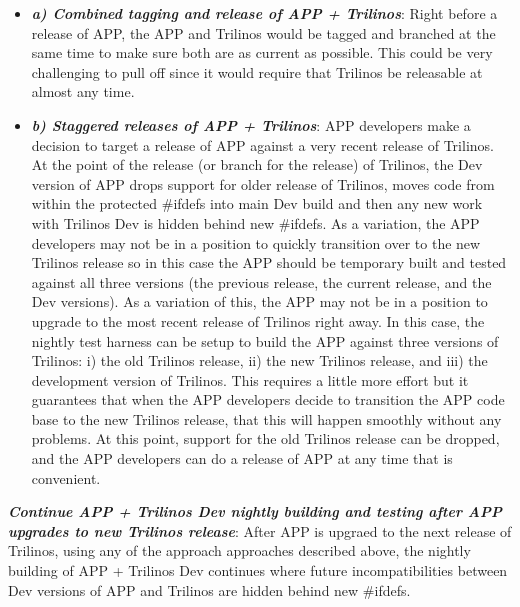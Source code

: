 \documentclass[pdf,ps2pdf,11pt]{SANDreport}
\begin{document}
    \begin{itemize}

    {}\item\textit{\textbf{a) Combined tagging and release of APP +
    Trilinos}}: Right before a release of APP, the APP and Trilinos would be
    tagged and branched at the same time to make sure both are as current as
    possible.  This could be very challenging to pull off since it would
    require that Trilinos be releasable at almost any time.

    {}\item\textit{\textbf{b) Staggered releases of APP + Trilinos}}: APP
    developers make a decision to target a release of APP against a very
    recent release of Trilinos.  At the point of the release (or branch for
    the release) of Trilinos, the Dev version of APP drops support for older
    release of Trilinos, moves code from within the protected {}\#ifdefs into
    main Dev build and then any new work with Trilinos Dev is hidden behind
    new {}\#ifdefs.  As a variation, the APP developers may not be in a
    position to quickly transition over to the new Trilinos release so in this
    case the APP should be temporary built and tested against all three
    versions (the previous release, the current release, and the Dev
    versions).  As a variation of this, the APP may not be in a position to
    upgrade to the most recent release of Trilinos right away.  In this case,
    the nightly test harness can be setup to build the APP against three
    versions of Trilinos: i) the old Trilinos release, ii) the new Trilinos
    release, and iii) the development version of Trilinos.  This requires a
    little more effort but it guarantees that when the APP developers decide
    to transition the APP code base to the new Trilinos release, that this will
    happen smoothly without any problems.  At this point, support for the old
    Trilinos release can be dropped, and the APP developers can do a release
    of APP at any time that is convenient.

    \end{itemize}

{}\textit{\textbf{Continue APP + Trilinos Dev nightly building and testing
after APP upgrades to new Trilinos release}}: After APP is upgraed to the next
release of Trilinos, using any of the approach approaches described above, the
nightly building of APP + Trilinos Dev continues where future
incompatibilities between Dev versions of APP and Trilinos are hidden behind
new {}\#ifdefs.
\end{document}
